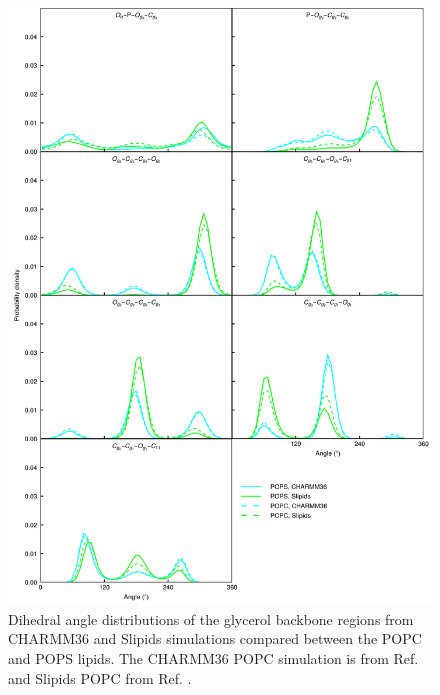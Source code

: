 \documentclass[journal=jpcbfk]{achemso}
\begin{document}
\begin{figure}[]
  \centering
  \includegraphics[width=15.0cm]{../Figs/figS6PC.png}
  \caption{\label{dihedralsGLYpc}
    Dihedral angle distributions of the glycerol backbone regions from CHARMM36 and Slipids simulations
    compared between the POPC and POPS lipids.
    The CHARMM36 POPC simulation is from Ref.  and Slipids POPC from Ref. .
  }
\end{figure}
\end{document}
